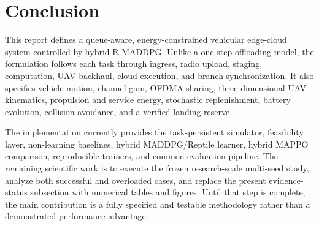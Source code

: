 \documentclass[journal]{IEEEtran}
\begin{document}
\newpage
\section{Conclusion}
\label{conclusion}
This report defines a queue-aware, energy-constrained vehicular edge-cloud
system controlled by hybrid R-MADDPG.  Unlike a one-step offloading model, the
formulation follows each task through ingress, radio upload, staging,
computation, UAV backhaul, cloud execution, and branch synchronization.  It
also specifies vehicle motion, channel gain, OFDMA sharing, three-dimensional
UAV kinematics, propulsion and service energy, stochastic replenishment,
battery evolution, collision avoidance, and a verified landing reserve.

The implementation currently provides the task-persistent simulator,
feasibility layer, non-learning baselines, hybrid MADDPG/Reptile learner,
hybrid MAPPO comparison, reproducible trainers, and common evaluation
pipeline.  The remaining scientific work is to execute the frozen
research-scale multi-seed study, analyze both successful and overloaded
cases, and replace the present evidence-status subsection with numerical
tables and figures.  Until that step is complete, the main contribution is a
fully specified and testable methodology rather than a demonstrated
performance advantage.
\end{document}

